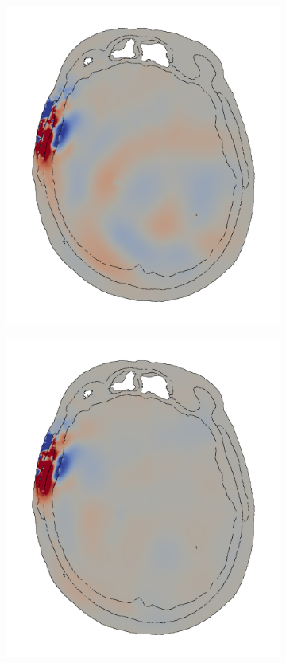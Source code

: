 \begin{figure}[H]
\begin{subfigure}{.3\textwidth}
\end{subfigure}
\begin{subfigure}{.3\textwidth}
  \centering
  \includegraphics[width=1.0\linewidth]{pictures/skull/elastic-pressure-z-with-bounds/six/5.png}
\end{subfigure}
\begin{subfigure}{.3\textwidth}
  \centering
  \includegraphics[width=1.0\linewidth]{pictures/skull/elastic-pressure-z-with-bounds/six/6.png}

\end{subfigure}
\end{figure}

